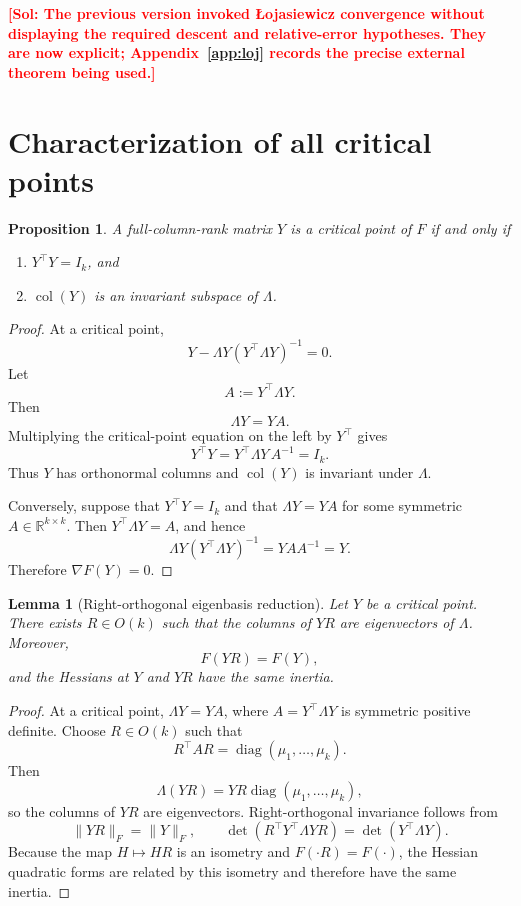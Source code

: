 \documentclass[11pt]{article}
\newcommand{\RR}{\mathbb{R}}
\newcommand{\col}{\operatorname{col}}
\newcommand{\diag}{\operatorname{diag}}
\newcommand{\sol}[1]{\textcolor{red}{\textbf{[Sol: #1]}}}
\newtheorem{lemma}{Lemma}
\newtheorem{proposition}{Proposition}
\begin{document}
\sol{The previous version invoked \L{}ojasiewicz convergence without displaying the required descent and relative-error hypotheses. They are now explicit; Appendix~\ref{app:loj} records the precise external theorem being used.}

\section{Characterization of all critical points}

\begin{proposition}
\label{prop:critical-points}
A full-column-rank matrix \(Y\) is a critical point of \(F\) if and only if
\begin{enumerate}[label=(\roman*)]
    \item \(Y^\top Y=I_k\), and
    \item \(\col(Y)\) is an invariant subspace of \(\Lambda\).
\end{enumerate}
\end{proposition}

\begin{proof}
At a critical point,
\[
Y-\Lambda Y(Y^\top\Lambda Y)^{-1}=0.
\]
Let
\[
A:=Y^\top\Lambda Y.
\]
Then
\[
\Lambda Y=YA.
\tag{17}
\label{eq:invariance}
\]
Multiplying the critical-point equation on the left by \(Y^\top\) gives
\[
Y^\top Y
=
Y^\top\Lambda Y\,A^{-1}
=
I_k.
\tag{18}
\label{eq:orthonormal}
\]
Thus \(Y\) has orthonormal columns and \(\col(Y)\) is invariant under \(\Lambda\).

Conversely, suppose that \(Y^\top Y=I_k\) and that \(\Lambda Y=YA\) for some
symmetric \(A\in\RR^{k\times k}\). Then \(Y^\top\Lambda Y=A\), and hence
\[
\Lambda Y(Y^\top\Lambda Y)^{-1}
=
YAA^{-1}
=
Y.
\]
Therefore \(\nabla F(Y)=0\).
\end{proof}

\begin{lemma}[Right-orthogonal eigenbasis reduction]
\label{lem:eigenbasis-rotation}
Let \(Y\) be a critical point. There exists \(R\in O(k)\) such that the
columns of \(YR\) are eigenvectors of \(\Lambda\). Moreover,
\[
F(YR)=F(Y),
\]
and the Hessians at \(Y\) and \(YR\) have the same inertia.
\end{lemma}

\begin{proof}
At a critical point, \(\Lambda Y=YA\), where \(A=Y^\top\Lambda Y\) is symmetric positive
definite. Choose \(R\in O(k)\) such that
\[
R^\top AR=\diag(\mu_1,\ldots,\mu_k).
\]
Then
\[
\Lambda(YR)
=
YR\diag(\mu_1,\ldots,\mu_k),
\]
so the columns of \(YR\) are eigenvectors. Right-orthogonal invariance follows
from
\[
\|YR\|_F=\|Y\|_F,
\qquad
\det(R^\top Y^\top\Lambda YR)=\det(Y^\top\Lambda Y).
\]
Because the map \(H\mapsto HR\) is an isometry and \(F(\cdot R)=F(\cdot)\),
the Hessian quadratic forms are related by this isometry and therefore have
the same inertia.
\end{proof}
\end{document}
